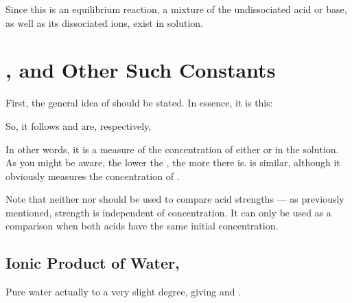 				Since this is an equilibrium reaction, a mixture of the undissociated acid or base, as well as its dissociated ions,
				exist in solution.




	\section{\MpH{}, \MpOH{} and Other Such Constants}

		First, the general idea of  should be stated. In essence, it is this:


		So, it follows \pH{} and \pOH{} are, respectively,


		In other words, it is a measure of the concentration of either  or  in the solution. As you might be aware, the
		lower the \pH{}, the more  there is. \pOH{} is similar, although it obviously measures the concentration of .

		Note that neither \pH{} nor \pOH{} should be used to compare acid strengths --- as previously mentioned, strength is independent
		of concentration. It can only be used as a comparison when both acids have the same initial concentration.


		\pagebreak
		\subsection{Ionic Product of Water, \MKw{}}

			Pure water actually  to a very slight degree, giving  and .


